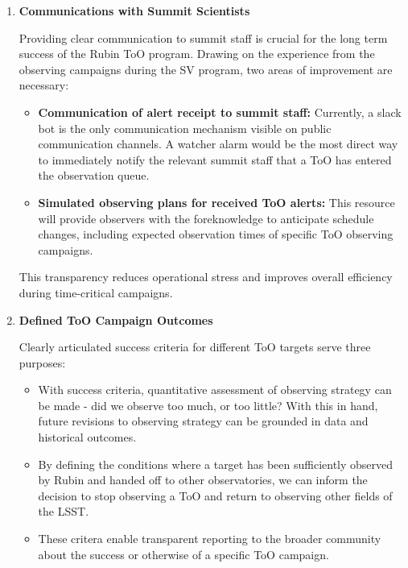 \begin{enumerate}
Formal coordination will minimize ambiguity during high-pressure events and ensure that operational decisions are consistent, auditable, and reproducible.

\item \textbf{Communications with Summit Scientists}

Providing clear communication to summit staff is crucial for the long term success of the Rubin ToO program. Drawing on the experience from the observing campaigns during the SV program, two areas of improvement are necessary:

\begin{itemize}
    \item \textbf{Communication of alert receipt to summit staff:} Currently, a slack bot is the only communication mechanism visible on public communication channels. A watcher alarm would be the most direct way to immediately notify the relevant summit staff that a ToO has entered the observation queue.
    \item \textbf{Simulated observing plans for received ToO alerts:} This resource will provide observers with the foreknowledge to anticipate schedule changes, including expected observation times of specific ToO observing campaigns.
\end{itemize}

This transparency reduces operational stress and improves overall efficiency during time-critical campaigns.

\item \textbf{Defined ToO Campaign Outcomes}

Clearly articulated success criteria for different ToO targets serve three purposes:

\begin{itemize}
    \item With success criteria, quantitative assessment of observing strategy can be made - did we observe too much, or too little? With this in hand, future revisions to observing strategy can be grounded in data and historical outcomes.
    \item By defining the conditions where a target has been sufficiently observed by Rubin and handed off to other observatories, we can inform the decision to stop observing a ToO and return to observing other fields of the LSST.
    \item These critera enable transparent reporting to the broader community about the success or otherwise of a specific ToO campaign.
\end{itemize}


\end{enumerate}
